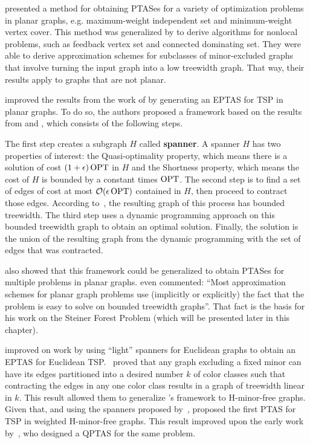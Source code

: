 \cite{baker1994} presented a method for obtaining PTASes for a variety of optimization problems in planar graphs, e.g. maximum-weight independent set and minimum-weight vertex cover. This method was generalized by \cite{demaine2005} to derive algorithms for nonlocal problems, such as feedback vertex set and connected dominating set. They were able to derive approximation schemes for subclasses of minor-excluded graphs that involve turning the input graph into a low treewidth graph. That way, their results apply to graphs that are not planar.

\cite{KleinTSP} improved the results from the work of \cite{basicPTASplanarTSP} by generating an EPTAS for TSP in planar graphs. 
To do so, the authors proposed a framework based on the results from \cite{baker1994} and \cite{demaine2005}, which consists of the following steps.

The first step creates a subgraph \(H\) called \textbf{spanner}.
A spanner \(H\) has two properties of interest: the Quasi-optimality property, which means there is a solution of cost \((1 + \epsilon) \operatorname{\textrm{OPT}}\) in \(H\) and the Shortness property, which means the cost of \(H\) is bounded by a constant times \(\operatorname{\textrm{OPT}}\). The second step is to find a set of edges of cost at most \(\mathcal{O}(\epsilon \operatorname{\textrm{OPT}})\) contained in \(H\), then proceed to contract those edges. According to~\cite{Demaine2010}, the resulting graph of this process has bounded treewidth. The third step uses a dynamic programming approach on this bounded treewidth graph to obtain an optimal solution. Finally, the solution is the union of the resulting graph from the dynamic programming with the set of edges that was contracted.

\cite{KleinTSP} also showed that this framework could be generalized to obtain PTASes for multiple problems in planar graphs. \cite{Bateni} even commented: ``Most approximation schemes for planar graph problems use (implicitly or explicitly) the fact that the problem is easy to solve on bounded treewidth graphs''. That fact is the basis for his work on the Steiner Forest Problem (which will be presented later in this chapter).

\cite{EPTASeuclidianTSP} improved on \cite{PTASeuclidianTSP} work by using ``light'' spanners for Euclidean graphs to obtain an EPTAS for Euclidean TSP.~\cite{contraction-decomposition-in-h-minor-free-graphs} proved that any graph excluding a fixed minor can have its edges partitioned into a desired number \(k\) of color classes such that contracting the edges in any one color class results in a graph of treewidth linear in \(k\). This result allowed them to generalize \citeauthor{KleinTSP}'s framework to H-minor-free graphs. Given that, and using the spanners proposed by~\cite{light_spanners_tsp}, \citeauthor{contraction-decomposition-in-h-minor-free-graphs} proposed the first PTAS for TSP in weighted H-minor-free graphs. This result improved upon the early work by~\cite{light_spanners_tsp}, who designed a QPTAS for the same problem.

